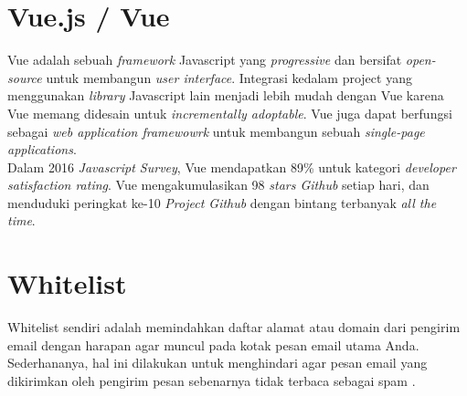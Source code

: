 	\section{Vue.js / Vue}
	  Vue adalah sebuah \textit{framework} Javascript yang \textit{progressive} dan bersifat \textit{open-source} untuk membangun \textit{user interface}. Integrasi kedalam project yang menggunakan \textit{library } Javascript lain menjadi lebih mudah dengan Vue karena Vue memang didesain untuk \textit{incrementally adoptable}. Vue juga dapat berfungsi sebagai \textit{web application framewowrk} untuk membangun sebuah \textit{single-page applications}.
	  \\ \indent
	  Dalam 2016 \textit{Javascript Survey}, Vue mendapatkan 89\% untuk kategori \textit{developer satisfaction rating}. Vue mengakumulasikan 98 \textit{stars Github} setiap hari, dan menduduki peringkat ke-10 \textit{Project Github} dengan bintang terbanyak \textit{all the time}\cite{wikipedia_vue.js_2017}.
	  
	  
	
	
	\section{Whitelist}
	Whitelist sendiri adalah memindahkan daftar alamat atau domain dari pengirim email dengan harapan agar muncul pada kotak pesan email utama Anda. Sederhananya, hal ini dilakukan untuk menghindari agar pesan email yang dikirimkan oleh pengirim pesan sebenarnya tidak terbaca sebagai spam \cite{wikipedia_sendgrid_2017}.
